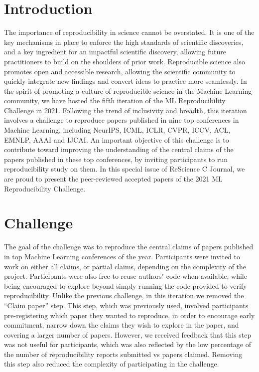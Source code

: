 
\section{Introduction}

The importance of reproducibility in science cannot be overstated. It is one of the key mechanisms in place to enforce the high standards of scientific discoveries, and a key ingredient for an impactful scientific discovery, allowing future practitioners to build on the shoulders of prior work. Reproducible science also promotes open and accessible research, allowing the scientific community to quickly integrate new findings and convert ideas to practice more seamlessly. In the spirit of promoting a culture of reproducible science in the Machine Learning community, we have hosted the fifth iteration of the ML Reproducibility Challenge in 2021.
Following the trend of inclusivity and breadth, this iteration involves a challenge to reproduce papers published in nine top conferences in Machine Learning, including NeurIPS, ICML, ICLR, CVPR, ICCV, ACL, EMNLP, AAAI and IJCAI. An important objective of this challenge is to contribute toward improving the understanding of the central claims of the papers published in these top conferences, by inviting participants to run reproducibility study on them. In this special issue of ReScience C Journal, we are proud to present the peer-reviewed accepted papers of the 2021 ML Reproducibility Challenge.

\section{Challenge}

The goal of the challenge was to reproduce the central claims of papers published in top Machine Learning conferences of the year. Participants were invited to work on either all claims, or partial claims, depending on the complexity of the project. Participants were also free to reuse authorsʼ code when available, while being encouraged to explore beyond simply running the code provided to verify reproducibility. Unlike the previous challenge, in this iteration we removed the “Claim paper” step. This step, which was previously used, involved participants pre-registering which paper they wanted to reproduce, in order to encourage early commitment, narrow down the claims they wish to explore in the paper, and covering a larger number of papers. However, we received feedback that this step was not useful for participants, which was also reflected by the low percentage of the number of reproducibility reports submitted vs papers claimed. Removing this step also reduced the complexity of participating in the challenge.

